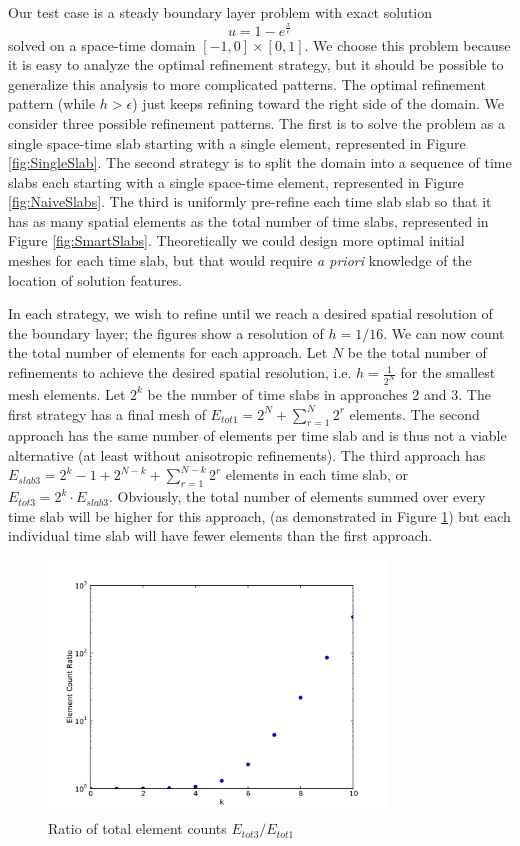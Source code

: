 \documentclass[Dissertation.tex]{subfiles}
\begin{document}
Our test case is a steady boundary layer problem with exact solution
\[
u=1-e^\frac{x}{\epsilon}
\]
solved on a space-time domain $[-1,0]\times[0,1]$.
We choose this problem because it is easy to analyze the optimal refinement strategy, but it should be
possible to generalize this analysis to more complicated patterns.
The optimal refinement pattern (while $h > \epsilon$) just keeps refining toward the right side of the domain.
We consider three possible refinement patterns. 
The first is to solve the problem as a single space-time slab starting with a single element, represented in
Figure \ref{fig:SingleSlab}.
The second strategy is to split the domain into a sequence of time slabs each starting with a single space-time element, represented in Figure \ref{fig:NaiveSlabs}.
The third is uniformly pre-refine each time slab slab so that it has as many spatial elements as the total number of time slabs, represented in Figure \ref{fig:SmartSlabs}.
Theoretically we could design more optimal initial meshes for each time slab, but that would 
require \emph{a priori} knowledge of the location of solution features.



In each strategy, we wish to refine until we reach a desired spatial resolution of the boundary layer; the figures show a resolution of $h=1/16$.
We can now count the total number of elements for each approach. 
Let $N$ be the total number of refinements to achieve the desired spatial resolution, i.e. $h=\frac{1}{2^N}$
for the smallest mesh elements.
Let $2^k$ be the number of time slabs in approaches 2 and 3.
The first strategy has a final mesh of 
$
E_{tot1}=2^N+\sum_{r=1}^N 2^r
$
elements.
The second approach has the same number of elements per time slab and is thus not a viable alternative 
(at least without anisotropic refinements).
The third approach has
$  
E_{slab3}=2^{k}-1+2^{N-k}+\sum_{r=1}^{N-k}2^r
$
elements in each time slab, or $E_{tot3}=2^k\cdot E_{slab3}$.
Obviously, the total number of elements summed over every time slab will be higher for this approach, 
(as demonstrated in Figure \ref{fig:ElementCountRatio})
but each individual time slab will have fewer elements than the first approach.

\begin{figure}
\centering
\includegraphics[width=0.8\textwidth]{Dissertation/Scaling/RatioElementCount.pdf}
\caption{Ratio of total element counts $E_{tot3}/E_{tot1}$}
\label{fig:ElementCountRatio}
\end{figure}
\end{document}
